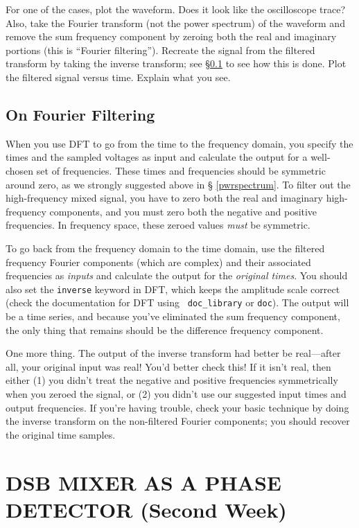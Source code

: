 \documentclass[11pt,preprint]{aastex}
\begin{document}
For one of the cases, plot the waveform.  Does it look like the
oscilloscope trace? Also, take the Fourier transform (not the power
spectrum) of the waveform and remove the sum frequency component by
zeroing both the real and imaginary portions (this is ``Fourier
filtering'').  Recreate the signal from the filtered transform by taking
the inverse transform; see \S \ref{fourierfilter} to see how this is
done. Plot the filtered signal versus time.  Explain what you see.

\subsection {On  Fourier Filtering} \label{fourierfilter}

When you use DFT to go from the time to the frequency domain, you
specify the times and the sampled voltages as input and calculate the
output for a well-chosen set of frequencies.  These times and
frequencies should be symmetric around zero, as we strongly suggested above in \S
\ref{pwrspectrum}.  To filter out the high-frequency mixed signal, you
have to zero both the real and imaginary high-frequency components,
and you must zero both the negative and positive frequencies. In
frequency space, these zeroed values {\it must} be symmetric.

To go back from the frequency domain to the time domain, use the 
  filtered frequency Fourier components (which are complex) and their associated frequencies
  as {\it inputs} and calculate the output for the {\it original times}.
  You should also set the {\tt inverse} keyword in DFT, which keeps the
  amplitude scale correct (check the documentation for DFT using {\tt
  doc\_library} or {\tt doc}). The output will be a time series, and because you've
  eliminated the sum frequency component, the only thing that remains
  should be the difference frequency component.

One more thing. The output of the inverse transform had better be
real---after all, your original input was real! You'd better check this!
If it isn't real, then either (1) you didn't treat the negative and positive
frequencies symmetrically when you zeroed the signal, or (2) you didn't
use our suggested input times and output frequencies. If you're having
trouble, check your basic technique by doing the inverse transform on
the non-filtered Fourier components; you should recover the original
time samples.

\section{DSB MIXER AS A PHASE DETECTOR (Second Week)} \label{phasedetector}
\end{document}
